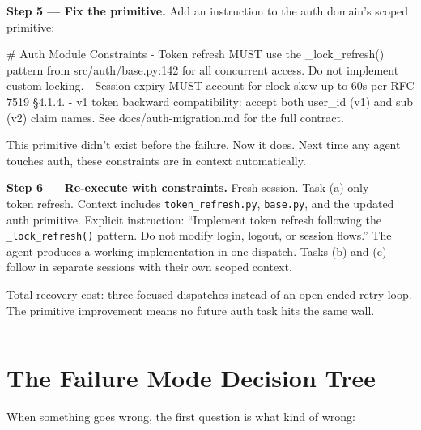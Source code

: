 \documentclass[
  a4paper,
  DIV=11,
  numbers=noendperiod]{scrreprt}
\newenvironment{Shaded}{\begin{snugshade}}{\end{snugshade}}
\newcommand{\FunctionTok}[1]{\textcolor[rgb]{0.28,0.35,0.67}{#1}}
\newcommand{\InformationTok}[1]{\textcolor[rgb]{0.37,0.37,0.37}{#1}}
\newcommand{\NormalTok}[1]{\textcolor[rgb]{0.00,0.23,0.31}{#1}}
\newcommand{\SpecialStringTok}[1]{\textcolor[rgb]{0.13,0.47,0.30}{#1}}
\begin{document}
\textbf{Step 5 --- Fix the primitive.} Add an instruction to the auth
domain's scoped primitive:

\begin{Shaded}
\begin{Highlighting}[]
\FunctionTok{\# Auth Module Constraints}
\SpecialStringTok{{-} }\NormalTok{Token refresh MUST use the }\InformationTok{\textasciigrave{}\_lock\_refresh()\textasciigrave{}}\NormalTok{ pattern from }\InformationTok{\textasciigrave{}src/auth/base.py:142\textasciigrave{}}
\NormalTok{  for all concurrent access. Do not implement custom locking.}
\SpecialStringTok{{-} }\NormalTok{Session expiry MUST account for clock skew up to 60s per RFC 7519 §4.1.4.}
\SpecialStringTok{{-} }\NormalTok{v1 token backward compatibility: accept both }\InformationTok{\textasciigrave{}user\_id\textasciigrave{}}\NormalTok{ (v1) and }\InformationTok{\textasciigrave{}sub\textasciigrave{}}\NormalTok{ (v2)}
\NormalTok{  claim names. See }\InformationTok{\textasciigrave{}docs/auth{-}migration.md\textasciigrave{}}\NormalTok{ for the full contract.}
\end{Highlighting}
\end{Shaded}

This primitive didn't exist before the failure. Now it does. Next time
any agent touches auth, these constraints are in context automatically.

\textbf{Step 6 --- Re-execute with constraints.} Fresh session. Task (a)
only --- token refresh. Context includes \texttt{token\_refresh.py},
\texttt{base.py}, and the updated auth primitive. Explicit instruction:
``Implement token refresh following the \texttt{\_lock\_refresh()}
pattern. Do not modify login, logout, or session flows.'' The agent
produces a working implementation in one dispatch. Tasks (b) and (c)
follow in separate sessions with their own scoped context.

Total recovery cost: three focused dispatches instead of an open-ended
retry loop. The primitive improvement means no future auth task hits the
same wall.

\begin{center}\rule{0.5\linewidth}{0.5pt}\end{center}

\section{The Failure Mode Decision
Tree}\label{the-failure-mode-decision-tree}

When something goes wrong, the first question is what kind of wrong:
\end{document}
